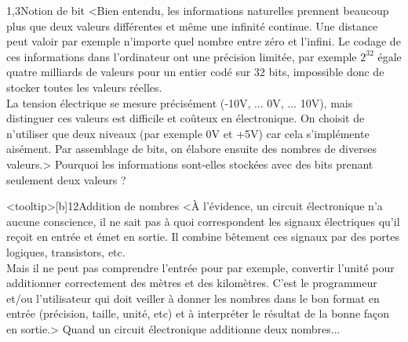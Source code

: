 \begin{quiz}[title={Représentation de l'information}]
\vspace{-.5\baselineskip}
\begin{quizquestion*}[c]{2}{1,3}{Notion de bit}
<Bien entendu, les informations naturel\-les prennent beaucoup plus que deux valeurs différentes et même une infini\-té continue. Une distance peut valoir par exemple n'importe quel nombre entre zéro et l'infini. Le codage de ces informations dans l'ordinateur ont une précision limitée, par exemple $2^{32}$ égale quatre milliards de valeurs pour un entier codé sur 32 bits, impossible donc de stocker toutes les valeurs réelles.\\
La tension électrique se mesure précisément (-10V, ... 0V, ... 10V), mais distinguer ces valeurs est difficile et coûteux en électronique. On choisit de n'utiliser que deux niveaux (par exemple 0V et +5V) car cela s'implémente aisément. Par assemblage de bits, on élabore ensuite des nombres de diverses valeurs.>
Pourquoi les informations sont-elles stockées avec des bits prenant seulement deux valeurs ?
\end{quizquestion*}

\begin{quizquestion*}<tooltip>[b]{1}{2}{Addition de nombres}
<À l'évidence, un circuit électronique n'a aucune conscience, il ne sait pas à quoi correspondent les signaux électriques qu'il reçoit en entrée et émet en sortie. Il combine bêtement ces signaux par des portes logiques, transistors, etc.\\
Mais il ne peut pas comprendre l'entrée pour par exemple, convertir l'unité pour additionner correctement des mètres et des kilomètres. C'est le programmeur et/ou l'utilisateur qui doit veiller à donner les nombres dans le bon format en entrée (précision, taille, unité, etc) et à interpréter le résultat de la bonne façon en sortie.>
Quand un circuit électronique additionne deux nombres...
\end{quizquestion*}


\end{quiz}
